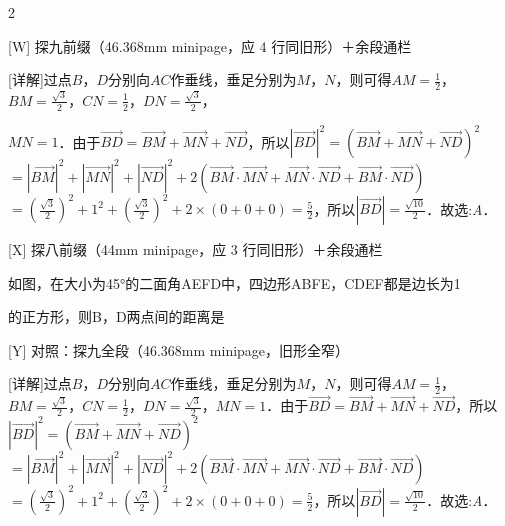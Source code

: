 \documentclass[fontset=none]{ctexart}
\begin{document}
\begin{multicols}{2}
\def\PnA{[详解]过点\(B\)，\(D\)分别向\(AC\)作垂线，垂足分别为\(M\)，\(N\)，则可得\(AM = \frac{1}{2}\)，\(BM = \frac{\sqrt{3}}{2}\)，\(CN = \frac{1}{2}\)，\(DN = \frac{\sqrt{3}}{2}\)，}
\def\PnB{\(MN = 1\)．由于\(\overrightarrow{BD} = \overrightarrow{BM} + \overrightarrow{MN} + \overrightarrow{ND}\)，所以\(|\overrightarrow{BD}|^{2} = {(\overrightarrow{BM} + \overrightarrow{MN} + \overrightarrow{ND})}^{2}\)\allowbreak\(= |\overrightarrow{BM}|^{2} + |\overrightarrow{MN}|^{2} + |\overrightarrow{ND}|^{2} + 2(\overrightarrow{BM} \cdot \overrightarrow{MN} + \overrightarrow{MN} \cdot \overrightarrow{ND} + \overrightarrow{BM} \cdot \overrightarrow{ND})\)\allowbreak\(= ( \frac{\sqrt{3}}{2} )^{2} + 1^{2} + ( \frac{\sqrt{3}}{2} )^{2} + 2 \times (0 + 0 + 0) = \frac{5}{2}\)，所以\(|\overrightarrow{BD}| = \frac{\sqrt{10}}{2}\)．故选:\emph{A}．}
\def\PmA{如图，在大小为45°的二面角A\-EF\-D中，四边形ABFE，CDEF都是边长为1}
\def\PmB{的正方形，则B，D两点间的距离是}

[W] 探九前缀（46.368mm minipage，应 4 行同旧形）＋余段通栏\par
\noindent\begin{minipage}[t]{46.368mm}\raggedright \PnA\end{minipage}\par
\PnB\par
\vspace{3mm}

[X] 探八前缀（44mm minipage，应 3 行同旧形）＋余段通栏\par
\noindent\begin{minipage}[t]{44mm}\raggedright \PmA\end{minipage}\par
\PmB\par
\vspace{3mm}

[Y] 对照：探九全段（46.368mm minipage，旧形全窄）\par
\noindent\begin{minipage}[t]{46.368mm}\raggedright \PnA\PnB\end{minipage}\par
\end{multicols}
\end{document}
